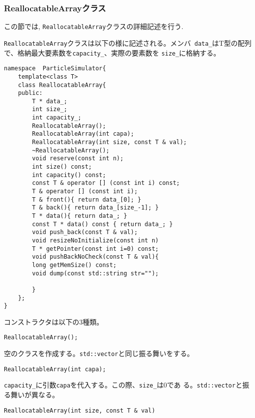 \subsubsection{ReallocatableArrayクラス}

この節では, {\tt ReallocatableArray}クラスの詳細記述を行う. 

{\tt ReallocatableArray}クラスは以下の様に記述される。メンバ{\tt
data\_}はT型の配列で、格納最大要素数を{\tt capacity\_}、実際の要素数を
{\tt size\_}に格納する。

\begin{lstlisting}[caption=DomainInfo]
namespace  ParticleSimulator{
    template<class T>
    class ReallocatableArray{
    public:
        T * data_;
        int size_;
        int capacity_;
        ReallocatableArray();
        ReallocatableArray(int capa);
        ReallocatableArray(int size, const T & val);
        ~ReallocatableArray();
        void reserve(const int n);
        int size() const;
        int capacity() const;
        const T & operator [] (const int i) const;
        T & operator [] (const int i);
        T & front(){ return data_[0]; }
        T & back(){ return data_[size_-1]; }
        T * data(){ return data_; }
        const T * data() const { return data_; }
        void push_back(const T & val);
        void resizeNoInitialize(const int n)
        T * getPointer(const int i=0) const;
        void pushBackNoCheck(const T & val){
        long getMemSize() const;
        void dump(const std::string str="");

        }
    };
}
\end{lstlisting}

コンストラクタは以下の3種類。

\begin{screen}
\begin{verbatim}
ReallocatableArray();
\end{verbatim}
\end{screen}

空のクラスを作成する。{\tt std::vector}と同じ振る舞いをする。

\begin{screen}
\begin{verbatim}
ReallocatableArray(int capa);
\end{verbatim}
\end{screen}

{\tt capacity\_}に引数{\tt capa}を代入する。この際、{\tt size\_}は0であ
る。{\tt std::vector}と振る舞いが異なる。

\begin{screen}
\begin{verbatim}
ReallocatableArray(int size, const T & val)
\end{verbatim}
\end{screen}

